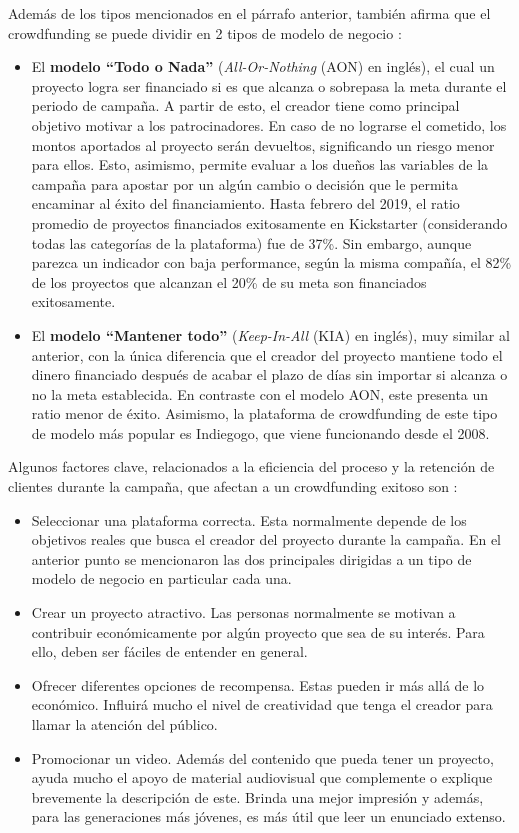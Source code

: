 Además de los tipos mencionados en el párrafo anterior, \citeauthor{cr_collins2014crwd} también afirma que el crowdfunding se puede dividir en 2 tipos de modelo de negocio \parencite{cr_lee2019crwdfactors}:
\begin{itemize}
	\item El \textbf{modelo “Todo o Nada”} (\textit{All-Or-Nothing} (AON) en inglés), el cual un proyecto logra ser financiado si es que alcanza o sobrepasa la meta durante el periodo de campaña. A partir de esto, el creador tiene como principal objetivo motivar a los patrocinadores. En caso de no lograrse el cometido, los montos aportados al proyecto serán devueltos, significando un riesgo menor para ellos. Esto, asimismo, permite evaluar a los dueños las variables de la campaña para apostar por un algún cambio o decisión que le permita encaminar al éxito del financiamiento. Hasta febrero del 2019, el ratio promedio de proyectos financiados exitosamente en Kickstarter (considerando todas las categorías de la plataforma) fue de 37\%. Sin embargo, aunque parezca un indicador con baja performance, según la misma compañía, el 82\% de los proyectos que alcanzan el 20\% de su meta son financiados exitosamente. 
	\item El \textbf{modelo “Mantener todo”} (\textit{Keep-In-All} (KIA) en inglés), muy similar al anterior, con la única diferencia que el creador del proyecto mantiene todo el dinero financiado después de acabar el plazo de días sin importar si alcanza o no la meta establecida. En contraste con el modelo AON, este presenta un ratio menor de éxito. Asimismo, la plataforma de crowdfunding de este tipo de modelo más popular es Indiegogo, que viene funcionando desde el 2008.
\end{itemize}

Algunos factores clave, relacionados a la eficiencia del proceso y la retención de clientes durante la campaña, que afectan a un crowdfunding exitoso son \parencite{cr_lee2019crwdfactors}:
\begin{itemize}
	\item Seleccionar una plataforma correcta. Esta normalmente depende de los objetivos reales que busca el creador del proyecto durante la campaña. En el anterior punto se mencionaron las dos principales dirigidas a un tipo de modelo de negocio en particular cada una.
	\item Crear un proyecto atractivo. Las personas normalmente se motivan a contribuir económicamente por algún proyecto que sea de su interés. Para ello, deben ser fáciles de entender en general.
	\item Ofrecer diferentes opciones de recompensa. Estas pueden ir más allá de lo económico. Influirá mucho el nivel de creatividad que tenga el creador para llamar la atención del público.
	\item Promocionar un video. Además del contenido que pueda tener un proyecto, ayuda mucho el apoyo de material audiovisual que complemente o explique brevemente la descripción de este. Brinda una mejor impresión y además, para las generaciones más jóvenes, es más útil que leer un enunciado extenso.
\end{itemize}


